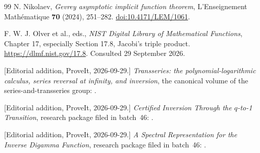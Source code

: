 \documentclass[11pt,a4paper]{article}
\numberwithin{equation}{section}
\theoremstyle{definition}
\theoremstyle{remark}
\begin{document}
\begin{thebibliography}{99}
N. Nikolaev, \emph{Gevrey asymptotic implicit function theorem},
L'Enseignement Math\'ematique \textbf{70} (2024), 251--282.
\href{https://doi.org/10.4171/LEM/1061}{doi:10.4171/LEM/1061}.

F. W. J. Olver et al., eds., \emph{NIST Digital Library of Mathematical
Functions}, Chapter 17, especially Section 17.8, Jacobi's triple product.
\url{https://dlmf.nist.gov/17.8}. Consulted 29 September 2026.

[Editorial addition, ProveIt, 2026-09-29.]
\emph{Transseries: the polynomial-logarithmic calculus, series reversal at
infinity, and inversion}, the canonical volume of the series-and-transseries
group:
.

[Editorial addition, ProveIt, 2026-09-29.]
\emph{Certified Inversion Through the \(q\)-to-1 Transition}, research
package filed in batch~46:
.

[Editorial addition, ProveIt, 2026-09-29.]
\emph{A Spectral Representation for the Inverse Digamma Function}, research
package filed in batch~46:
.
\end{thebibliography}
\end{document}
